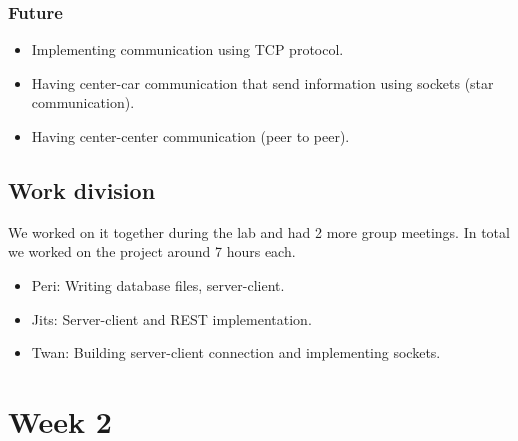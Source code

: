 \documentclass[a4paper]{article}
\begin{document}
\subsubsection*{Future}
\begin{itemize}
    \item Implementing communication using TCP protocol.
    \item Having center-car communication that send information using sockets (star communication).
    \item Having center-center communication (peer to peer).
\end{itemize}

\subsection*{Work division}
We worked on it together during the lab and had 2 more group meetings. In total we worked on the project around 7 hours each. 
\begin{itemize}
    \item Peri: Writing database files, server-client.
    \item Jits: Server-client and REST implementation.
    \item Twan: Building server-client connection and implementing sockets.
\end{itemize}


\section*{Week 2}
\end{document}
